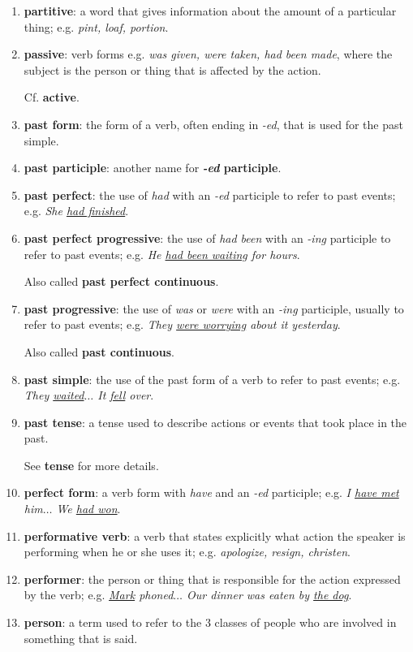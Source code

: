 \documentclass[oneside]{book}
\numberwithin{equation}{section}
\begin{document}
\begin{enumerate}
    See \textbf{\textit{-ed} participle} and \textbf{\textit{-ing} participle} for more details.
    \item \textbf{partitive}: a word that gives information about the amount of a particular thing; e.g. \textit{pint, loaf, portion}.
    \item \textbf{passive}: verb forms e.g. \textit{was given, were taken, had been made}, where the subject is the person or thing that is affected by the action.
    
    Cf. \textbf{active}.
    \item \textbf{past form}: the form of a verb, often ending in \textit{-ed}, that is used for the past simple.
    \item \textbf{past participle}: another name for \textbf{\textit{-ed} participle}.
    \item \textbf{past perfect}: the use of \textit{had} with an \textit{-ed} participle to refer to past events; e.g. \textit{She \underline{had finished}}.
    \item \textbf{past perfect progressive}: the use of \textit{had been} with an \textit{-ing} participle to refer to past events; e.g. \textit{He \underline{had been waiting} for hours}.
    
    Also called \textbf{past perfect continuous}.
    \item \textbf{past progressive}: the use of \textit{was} or \textit{were} with an \textit{-ing} participle, usually to refer to past events; e.g. \textit{They \underline{were worrying} about it yesterday}.
    
    Also called \textbf{past continuous}.
    \item \textbf{past simple}: the use of the past form of a verb to refer to past events; e.g. \textit{They \underline{waited}$\ldots$ It \underline{fell} over}.
    \item \textbf{past tense}: a tense used to describe actions or events that took place in the past.
    
    See \textbf{tense} for more details.
    \item \textbf{perfect form}: a verb form with \textit{have} and an \textit{-ed} participle; e.g. \textit{I \underline{have met} him$\ldots$ We \underline{had won}}.
    \item \textbf{performative verb}: a verb that states explicitly what action the speaker is performing when he or she uses it; e.g. \textit{apologize, resign, christen}.
    \item \textbf{performer}: the person or thing that is responsible for the action expressed by the verb; e.g. \textit{\underline{Mark} phoned$\ldots$ Our dinner was eaten by \underline{the dog}}.
    \item \textbf{person}: a term used to refer to the 3 classes of people who are involved in something that is said.
    

\end{enumerate}
\end{document}
